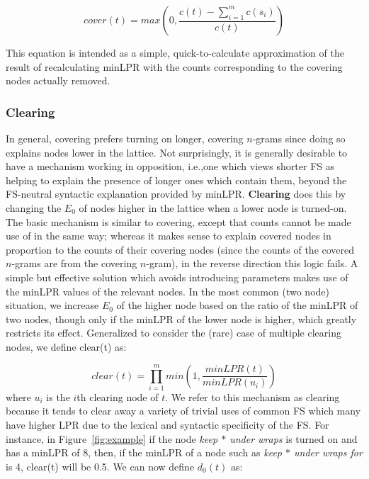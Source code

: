 \documentclass[11pt,letterpaper]{article}
\makeatletter
\def \ie {i.e.,\@ }
\newcommand{\gap}{$*$\xspace}
\newcommand{\ex}[1]{\textit{#1}\xspace}
\newcommand{\termdef}[1]{\textbf{#1}\xspace}
\newcommand{\figref}[2][]{Figure#1~\ref{#2}\xspace}
\makeatother
\begin{document}
\begin{displaymath}
cover(t) = max(0,\frac{c(t) - \sum_{i=1}^{m}{c(s_i)}}{c(t)})
\end{displaymath}

\noindent
This equation is intended as a simple, quick-to-calculate approximation of the result of recalculating minLPR with the counts corresponding to the covering nodes actually removed.

\subsubsection{Clearing}

In general, covering prefers turning on longer, covering $n$-grams since doing so explains nodes lower in the lattice. Not surprisingly, it is generally desirable to have a mechanism working in opposition, \ie one which views shorter FS as helping to explain the presence of longer ones which contain them, beyond the FS-neutral syntactic explanation provided by minLPR. \termdef{Clearing} does this by changing the $E_0$ of nodes higher in the lattice when a lower node is turned-on. The basic mechanism is similar to covering, except that counts cannot be made use of in the same way; whereas it makes sense to explain covered nodes in proportion to the counts of their covering nodes (since the counts of the covered $n$-grams are from the covering $n$-gram), in the reverse direction this logic fails. A simple but effective solution which avoids introducing parameters makes use of the minLPR values of the relevant nodes. In the most common (two node) situation, we increase $E_{0}$ of the higher node based on the ratio of the minLPR of two nodes, though only if the minLPR of the lower node is higher, which greatly restricts its effect. Generalized to consider the (rare) case of multiple clearing nodes, we define clear(t) as:


\begin{displaymath}
clear(t) = \prod_{i=1}^{m}{ min(1,\frac{minLPR(t)}{minLPR(u_i)})}
\end{displaymath}
where $u_i$ is the $i$th clearing node of $t$. We refer to this mechanism as clearing because it tends to clear away a variety of trivial uses of common FS which many have higher LPR due to the lexical and syntactic specificity of the FS. For instance, in \figref{fig:example} if the node \ex{keep \gap under wraps}  is turned on and has a minLPR of 8, then, if the minLPR of a node such as \ex{keep \gap under wraps for} is 4, clear(t) will be 0.5. We can now define $d_{0}(t)$ as:
\end{document}
